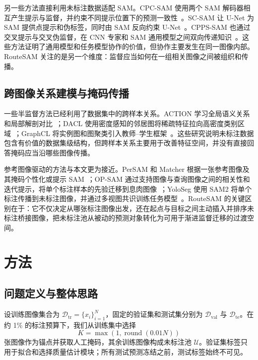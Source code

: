 \documentclass[UTF8,a4paper,10pt]{ctexart}
\begin{document}
另一些方法直接利用未标注数据适配 SAM。CPC-SAM 使用两个 SAM 解码器相互产生提示与监督，并约束不同提示位置下的预测一致性~\cite{miao2024cpcsam}。SC-SAM 让 U-Net 为 SAM 提供点提示和伪标签，同时由 SAM 反向约束 U-Net~\cite{vu2026scsam}。CPPS-SAM 也通过交叉提示与交叉伪监督，在 CNN 专家和 SAM 通用模型之间双向传递知识~\cite{zhang2026cppssam}。这些方法证明了通用模型和任务模型协作的价值，但协作主要发生在同一图像内部。RouteSAM 关注的是另一个维度：监督应当如何在一组相关图像之间被组织和传播。

\subsection{跨图像关系建模与掩码传播}

一些半监督方法已经利用了数据集中的跨样本关系。ACTION 学习全局语义关系和局部解剖对比~\cite{you2022action}；DACL 使用密度感知的邻居图将稀疏特征拉向高密度类别区域~\cite{tang2024dacl}；GraphCL 将实例图和图聚类引入教师--学生框架~\cite{wang2024graphcl}。这些研究说明未标注数据包含有价值的数据集级结构，但跨样本关系主要用于改善特征空间，并没有直接回答掩码应当沿哪些图像传播。

参考图像驱动的方法与本文更为接近。PerSAM 和 Matcher 根据一张参考图像及其掩码个性化或提示 SAM~\cite{zhang2023persam,liu2023matcher}；OP-SAM 通过支持图像与查询图像之间的相关性和迭代提示，将单个标注样本的先验迁移到息肉图像~\cite{mao2025opsam}；YoloSeg 使用 SAM2 将单个标注传播到未标注图像，并通过多视图共识训练任务模型~\cite{zhang2026yoloseg}。RouteSAM 的关键区别在于：它不仅决定从哪张标注图像出发，还在起点与目标之间主动插入并排序未标注桥接图像，把未标注池从被动的预测对象转化为可用于渐进监督迁移的过渡空间。

\section{方法}
\label{sec:method-zh}

\subsection{问题定义与整体思路}

设训练图像集合为 $\mathcal{D}_{\mathrm{tr}}=\{x_i\}_{i=1}^{N}$，固定的验证集和测试集分别为 $\mathcal{D}_{\mathrm{val}}$ 与 $\mathcal{D}_{\mathrm{te}}$。在约 1\% 的标注预算下，我们从训练集中选择
\begin{equation}
K=\max\left(1,\operatorname{round}(0.01N)\right)
\end{equation}
张图像作为锚点并获取人工掩码，其余训练图像构成未标注池 $\mathcal{U}$。验证集标签只用于拟合和选择质量估计模块；所有测试预测冻结之前，测试标签始终不可见。
\end{document}
